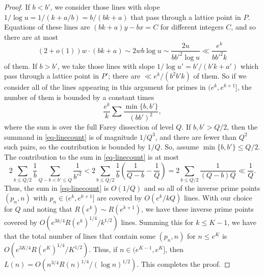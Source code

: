 \documentclass[10pt,a4paper]{amsart}
\begin{document}
\begin{proof}
If $b<b'$, we
consider those lines with slope $1/\log u=1/(k+a/b)=b/(bk+a)$ that pass through a lattice point in $P$.
Equations of these lines are $(bk+a)y - bx = C$ for different integers $C$,
and so there are at most
\[
(2+o(1))w \cdot (bk+a)\sim 2wb\log u\sim\frac{2u}{bb'^2\log u}\ll\frac{e^k}{bb'^2k}
\]
of them.  If $b>b'$, we take those lines with slope $1/\log u'=b'/(b'k+a')$ which pass through a
lattice point in $P'$; there are $\ll e^k/(b^2b'k)$ of them.
So if we consider all of the lines appearing in this argument for primes in $(e^k,e^{k+1}]$,
the number of them is bounded by a constant times
\begin{equation}
\label{eq-linecount}
\frac{e^k}k\sum\frac{\min\{b,b'\}}{(bb')^2},
\end{equation}
where the sum is over the full Farey dissection of level $Q$.  If $b,b'>Q/2$, then the summand
in \eqref{eq-linecount} is of magnitude $1/Q^3$, and there are fewer than $Q^2$ such pairs,
so the contribution is bounded by $1/Q$.  So, assume $\min\{b,b'\}\le Q/2$.
The contribution to the sum in \eqref{eq-linecount} is at most
\[
2\sum_{b\le Q/2}\frac1b\sum_{Q-b<b'\le Q}\frac1{b'^2}
<2\sum_{b\le Q/2}\frac1b\left(\frac1{Q-b}-\frac1Q\right)
=2\sum_{b\le Q/2}\frac1{(Q-b)Q}\ll\frac1Q.
\]
Thus, the sum in \eqref{eq-linecount} is $O(1/Q)$ and so all of the inverse prime points $(p_n,n)$ with $p_n\in(e^k,e^{k+1}]$ are covered by 
$O(e^k/kQ)$ lines.  With our choice for $Q$
and noting that $R(e^k)\sim R(e^{k+1})$, we have these inverse prime points covered
by $O(e^{3k/4}R(e^k)^{1/4}/k^{1/2})$ lines.  Summing this for $k\le K-1$, we have that the total number of lines that contain
some $(p_n,n)$ for $n\le e^K$ is $O(e^{3K/4}R(e^K)^{1/4}/K^{1/2})$.  Thus, if $n\in(e^{K-1},e^K]$, then
$L(n)=O(n^{3/4}R(n)^{1/4}/(\log n)^{1/2})$.  This completes the proof.
\end{proof}
\end{document}
